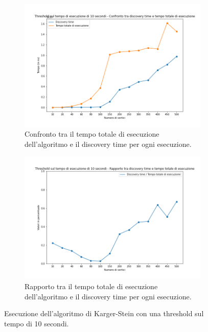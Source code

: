 \begin{figure}[H]
	\begin{subfigure}{.5\textwidth}
	  \centering
	  \includegraphics[width=1\textwidth]{res/images/single/karger-stein/discovery-time/threshold10/karger_stein_confronto_discovery_time_total_time_threshold_10s.png}
	  \caption{Confronto tra il tempo totale di esecuzione dell'algoritmo e il discovery time per ogni esecuzione.}
	  \label{fig:karger_stein_confronto_discovery_time_total_time_threshold_10s}
	\end{subfigure}
	\begin{subfigure}{.5\textwidth}
	  \centering
	  \includegraphics[width=1\textwidth]{res/images/single/karger-stein/discovery-time/threshold10/karger_stein_rapporto_discovery_time_total_time_threshold_10s.png}
	  \caption{Rapporto tra il tempo totale di esecuzione dell'algoritmo e il 
	  discovery time per ogni esecuzione.}
	  \label{fig:karger_stein_rapporto_discovery_time_total_time_threshold_10s}
	\end{subfigure}
	\caption{Esecuzione dell'algoritmo di Karger-Stein con una threshold sul tempo di 
	10 secondi.}
	\label{fig:karger_stein_discovery_time_threshold_10s}
\end{figure}

